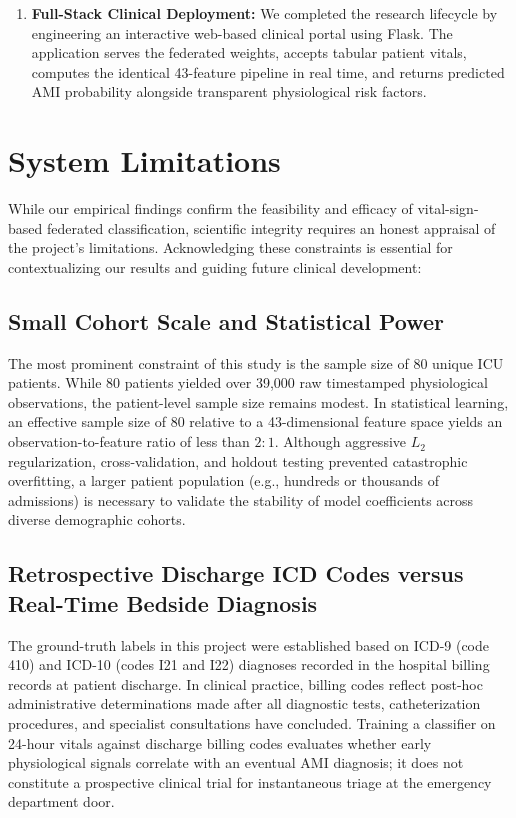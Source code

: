 \documentclass[12pt,a4paper,oneside]{report}
\begin{document}
\begin{enumerate}
    \item \textbf{Full-Stack Clinical Deployment:} We completed the research lifecycle by engineering an interactive web-based clinical portal using Flask. The application serves the federated weights, accepts tabular patient vitals, computes the identical 43-feature pipeline in real time, and returns predicted AMI probability alongside transparent physiological risk factors.
\end{enumerate}

\section{System Limitations}
\label{sec:system_limitations}

While our empirical findings confirm the feasibility and efficacy of vital-sign-based federated classification, scientific integrity requires an honest appraisal of the project's limitations. Acknowledging these constraints is essential for contextualizing our results and guiding future clinical development:

\subsection{Small Cohort Scale and Statistical Power}
The most prominent constraint of this study is the sample size of 80 unique ICU patients. While 80 patients yielded over 39,000 raw timestamped physiological observations, the patient-level sample size remains modest. In statistical learning, an effective sample size of 80 relative to a 43-dimensional feature space yields an observation-to-feature ratio of less than $2:1$. Although aggressive $L_2$ regularization, cross-validation, and holdout testing prevented catastrophic overfitting, a larger patient population (e.g., hundreds or thousands of admissions) is necessary to validate the stability of model coefficients across diverse demographic cohorts.

\subsection{Retrospective Discharge ICD Codes versus Real-Time Bedside Diagnosis}
The ground-truth labels in this project were established based on ICD-9 (code 410) and ICD-10 (codes I21 and I22) diagnoses recorded in the hospital billing records at patient discharge. In clinical practice, billing codes reflect post-hoc administrative determinations made after all diagnostic tests, catheterization procedures, and specialist consultations have concluded. Training a classifier on 24-hour vitals against discharge billing codes evaluates whether early physiological signals correlate with an eventual AMI diagnosis; it does not constitute a prospective clinical trial for instantaneous triage at the emergency department door.
\end{document}
